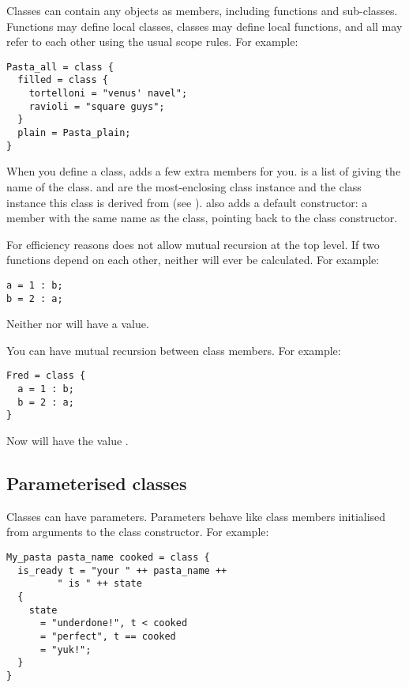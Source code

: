 Classes can contain any objects as members, including functions and
sub-classes. Functions may define local classes, classes may define local
functions, and all may refer to each other using the usual scope rules. For
example:

\begin{verbatim}
Pasta_all = class { 
  filled = class { 
    tortelloni = "venus' navel";
    ravioli = "square guys";
  }
  plain = Pasta_plain;
}
\end{verbatim}

When you define a class, \nip{} adds a few extra members for you. 
is a list of  giving the name of the class.  and
 are the most-enclosing class instance and the class instance
this class is derived from (see ). \nip{} also adds
a default constructor: a member with the same name as the class, pointing
back to the class constructor. 

For efficiency reasons \nip{} does not allow mutual recursion at the top
level. If two functions depend on each other, neither will ever be
calculated. For example:

\begin{verbatim}
a = 1 : b;
b = 2 : a;
\end{verbatim}

\noindent
Neither  nor  will have a value.

You can have mutual recursion between class members. For example:

\begin{verbatim}
Fred = class {
  a = 1 : b;
  b = 2 : a;
}
\end{verbatim}

\noindent
Now  will have the value \ct{[1, 2, 1, 2, 1, \ldots{}]}.

\subsection{Parameterised classes}

Classes can have parameters. Parameters behave like class members initialised
from arguments to the class constructor. For example:

\begin{verbatim}
My_pasta pasta_name cooked = class {
  is_ready t = "your " ++ pasta_name ++
         " is " ++ state
  {
    state
      = "underdone!", t < cooked
      = "perfect", t == cooked
      = "yuk!";
  }
}
\end{verbatim}

